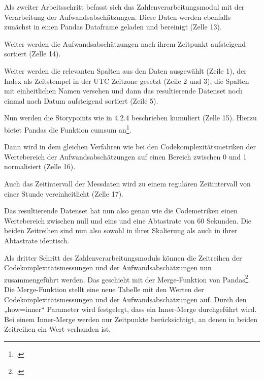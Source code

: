 Als zweiter Arbeitsschritt befasst sich das Zahlenverarbeitungsmodul mit
der Verarbeitung der Aufwandsabschätzungen. Diese Daten werden ebenfalls
zunächst in einen Pandas Dataframe geladen und bereinigt (Zelle 13).

\lstset{style=pythonStyle}


Weiter werden die Aufwandsabschätzungen nach ihrem Zeitpunkt aufsteigend
sortiert (Zelle 14).

\lstset{style=pythonStyle}


Weiter werden die relevanten Spalten aus den Daten ausgewählt (Zeile 1),
der Index als Zeitstempel in der UTC Zeitzone gesetzt (Zeile 2 und 3),
die Spalten mit einheitlichen Namen versehen und dann das resultierende
Datenset noch einmal nach Datum aufsteigend sortiert (Zeile 5).

\lstset{style=pythonStyle}


Nun werden die Storypoints wie in 4.2.4 beschrieben kumuliert (Zelle
15). Hierzu bietet Pandas die Funktion cumsum an\footcite[Vgl. ][]{PandasDataFrameCumsum}.

\lstset{style=pythonStyle}


Dann wird in dem gleichen Verfahren wie bei den Codekomplexitätsmetriken
der Wertebereich der Aufwandsabschätzungen auf einen Bereich zwischen 0
und 1 normalisiert (Zelle 16).

\lstset{style=pythonStyle}


Auch das Zeitintervall der Messdaten wird zu einem regulären
Zeitintervall von einer Stunde vereinheitlicht (Zelle 17).

\lstset{style=pythonStyle}


Das resultierende Datenset hat nun also genau wie die Codemetriken einen
Wertebereich zwischen null und eins und eine Abtastrate von 60 Sekunden.
Die beiden Zeitreihen sind nun also sowohl in ihrer Skalierung als auch
in ihrer Abtastrate identisch.

Als dritter Schritt des Zahlenverarbeitungsmoduls können die Zeitreihen
der Codekomplexitätsmessungen und der Aufwandsabschätzungen nun
zusammengeführt werden. Das geschieht mit der Merge-Funktion von
Pandas\footcite[Vgl. ][]{PandasDataFrameMergea}. Die Merge-Funktion stellt eine
neue Tabelle mit den Werten der Codekomplexitätsmessungen und der
Aufwandsabschätzungen auf. Durch den „how=inner`` Parameter wird
festgelegt, dass ein Inner-Merge durchgeführt wird. Bei einem
Inner-Merge werden nur Zeitpunkte berücksichtigt, an denen in beiden
Zeitreihen ein Wert verhanden ist.

